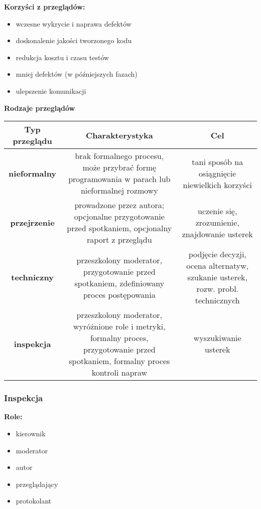 \documentclass[../main.tex]{subfiles}
\begin{document}
    \textbf{Korzyści z przeglądów:}
    \begin{itemize}
        \item wczesne wykrycie i naprawa defektów
        \item doskonalenie jakości tworzonego kodu
        \item redukcja kosztu i czasu testów
        \item mniej defektów (w późniejszych fazach)
        \item ulepszenie komunikacji
    \end{itemize}

    \textbf{Rodzaje przeglądów}

    \begin{tabular}{|c|c|c|}
        \hline
        \textbf{Typ przeglądu} & \textbf{Charakterystyka} & \textbf{Cel}\\
        \hline
        \textbf{nieformalny} & brak formalnego procesu, może przybrać formę programowania w parach lub nieformalnej rozmowy &
        tani sposób na osiągnięcie niewielkich korzyści\\
        \hline
        \textbf{przejrzenie} & prowadzone przez autora; opcjonalne przygotowanie przed spotkaniem,
        opcjonalny raport z przeglądu & uczenie się, zrozumienie, znajdowanie usterek\\
        \hline
        \textbf{techniczny} & przeszkolony moderator, przygotowanie przed spotkaniem, zdefiniowany proces
        postępowania & podjęcie decyzji, ocena alternatyw, szukanie usterek, rozw. probl. technicznych\\
        \hline
        \textbf{inspekcja} & przeszkolony moderator, wyróżnione role i metryki, formalny proces, przygotowanie przed
        spotkaniem, formalny proces kontroli napraw & wyszukiwanie usterek\\
        \hline
    \end{tabular}

    \subsubsection{Inspekcja}

    \textbf{Role:}
    \begin{itemize}
        \item kierownik
        \item moderator
        \item autor
        \item przeglądający
        \item protokolant
    \end{itemize}
\end{document}
